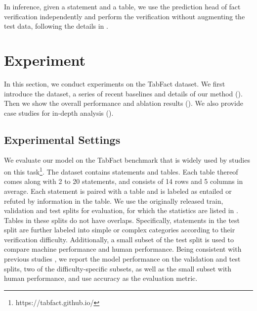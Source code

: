 \documentclass[11pt]{article}
\newcommand{\stitle}[1]{\vspace{0.3em} \noindent{\bf #1.}}
\begin{document}
In inference, given a statement and a table, we use the prediction head of fact verification independently and perform the verification without augmenting the test data, 
following the details in . 








 








\section{Experiment}
In this section, we conduct experiments on the TabFact dataset. We first introduce the dataset, a series of recent baselines and details of our method (). Then we show the overall performance and ablation results (). We also provide case studies for in-depth analysis ().


\subsection{Experimental Settings}\label{sec:exp_set}

\stitle{Dataset and Evaluation}
We evaluate our model on the TabFact benchmark \cite{chen2019tabfact} that is widely used by studies on this task\footnote{https://tabfact.github.io/}.
The dataset contains  statements and   tables.
Each table thereof comes along with 2 to 20 statements, and consists of 14 rows and 5 columns in average.
Each statement is paired with a table and is labeled as entailed or refuted by information in the table.
We use the originally released train, validation and test splits for evaluation, for which the statistics are listed in .
Tables in these splits do not have overlaps.
Specifically, statements in the test split are further labeled into simple or complex categories according to their verification difficulty.
Additionally, a small subset of the test split is used to compare machine performance and human performance.
Being consistent with previous studies \cite{chen2019tabfact, zhong2020logicalfactchecker, yang2020program, eisenschlos2020understanding},
we report the model performance on the validation and test splits, two of the difficulty-specific subsets, as well as the small subset with human performance, and use accuracy as the evaluation metric.
\end{document}
